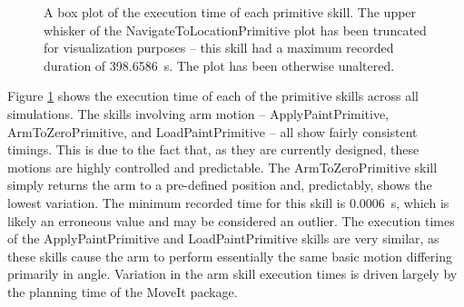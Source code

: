 \begin{figure}
    \centering
    \caption{A box plot of the execution time of each primitive skill. The upper whisker of the NavigateToLocationPrimitive plot has been truncated for visualization purposes -- this skill had a maximum recorded duration of \SI{398.6586}{\second}. The plot has been otherwise unaltered.}
    \label{fig:prim_time}
\end{figure}

Figure \ref{fig:prim_time} shows the execution time of each of the primitive skills across all simulations. The skills involving arm motion -- ApplyPaintPrimitive, ArmToZeroPrimitive, and LoadPaintPrimitive -- all show fairly consistent timings. This is due to the fact that, as they are currently designed, these motions are highly controlled and predictable. The ArmToZeroPrimitive skill simply returns the arm to a pre-defined position and, predictably, shows the lowest variation. The minimum recorded time for this skill is \SI{0.0006}{\second}, which is likely an erroneous value and may be considered an outlier. The execution times of the ApplyPaintPrimitive and LoadPaintPrimitive skills are very similar, as these skills cause the arm to perform essentially the same basic motion differing primarily in angle. Variation in the arm skill execution times is driven largely by the planning time of the MoveIt package.

